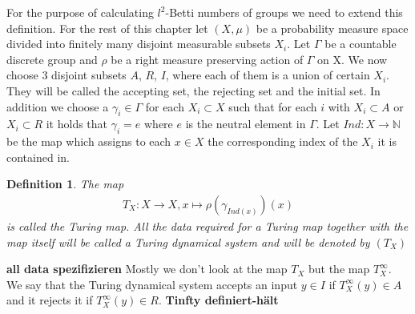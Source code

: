 \documentclass[12pt,a4paper]{scrartcl}
\newtheorem{Definition}[Theorem]{Definition}
\numberwithin{equation}{section}
\newcommand{\N}{\mathbb{N}} %
\newcommand{\2}{\mathbb{Z} / 2 \mathbb{Z}}
\begin{document}
For the purpose of calculating $l^2$-Betti numbers of groups we need to extend this definition. For the rest of this chapter let $(X, \mu)$ be a probability measure space divided into finitely many disjoint measurable subsets $X_i$. Let $\Gamma$ be a countable discrete group and $\rho$ be a right measure preserving action of $\Gamma$ on X.
We now choose 3 disjoint subsets $A$, $R$, $I$, where each of them is a union of certain $X_i$. They will be called the accepting set, the rejecting set and the initial set. In addition we choose a $\gamma_i \in \Gamma$ for each $X_i \subset X$ such that for each $i$ with $X_i \subset A$ or $X_i \subset R$ it holds that $\gamma_i = e$ where $e$ is the neutral element in $\Gamma$. 
Let $Ind: X \to \N$ be the map which assigns to each $x \in X$ the corresponding index of the $X_i$ it is contained in.
\begin{Definition}
	 The map 
	 \begin{align*}
	 T_X:X \to X, x \mapsto \rho(\gamma_{Ind(x)})(x)
	 \end{align*}
	 is called the Turing map.
	 All the data required for a Turing map together with the map itself will be called a Turing dynamical system and will be denoted by $(T_X)$
\end{Definition}
\textbf{all data spezifizieren}
Mostly we don't look at the map $T_X$ but the map $T_X^\infty$. We say that the Turing dynamical system accepts an input $y \in I$ if $T_X^\infty(y) \in A$ and it rejects it if $T_X^\infty(y) \in R$. \textbf{Tinfty definiert-hält}
\end{document}
